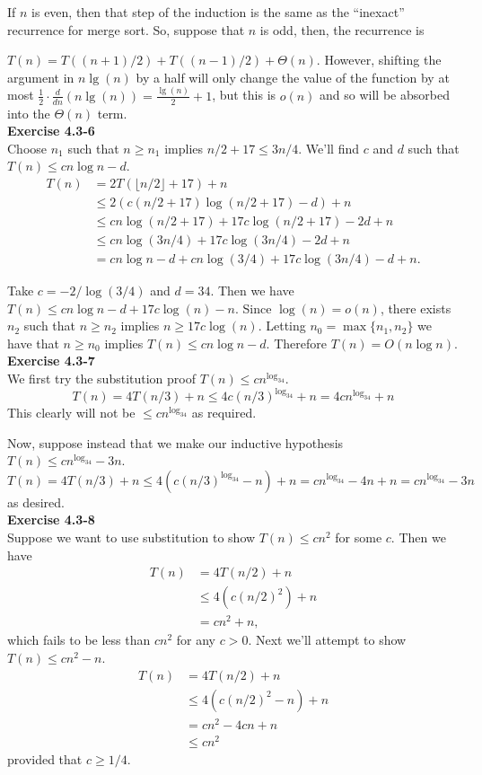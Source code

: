 \documentclass{article}
\begin{document}
If $n$ is even, then that step of the induction is the same as the ``inexact'' recurrence for merge sort. So, suppose that $n$ is odd, then, the recurrence is 

$T(n) = T((n+1)/2) + T((n-1)/2) + \Theta(n)$. However, shifting the argument in $n\lg(n)$ by a half will only change the value of the function by at most $\frac{1}{2}\cdot \frac{d}{dn}( n\lg(n)) = \frac{\lg(n)}{2} + 1$, but this is $o(n)$ and so will be absorbed into the $\Theta(n)$ term.\\

\noindent\textbf{Exercise 4.3-6}\\

Choose $n_1$ such that $n \geq n_1$ implies $n/2 + 17 \leq 3n/4$.  We'll find $c$ and $d$ such that $T(n) \leq cn\log n - d$.
\begin{align*}
T(n) &= 2T(\lfloor n/2 \rfloor + 17) + n \\
&\leq 2(c(n/2 + 17)\log(n/2 + 17) - d) + n \\
&\leq cn\log(n/2 + 17) + 17c\log(n/2 + 17) - 2d + n \\
&\leq cn\log(3n/4) + 17c\log(3n/4) - 2d + n\\
&= cn\log n - d +cn\log(3/4) + 17c\log(3n/4) - d + n.
\end{align*}

Take $c = -2/\log(3/4)$ and $d =34$.  Then we have $T(n) \leq cn\log n - d + 17c\log(n) - n$.  Since $\log(n) = o(n)$, there exists $n_2$ such that $n \geq n_2$ implies $n \geq 17c\log(n)$.  Letting $n_0 = \max\{n_1, n_2\}$ we have that $n \geq n_0$ implies $T(n) \leq cn\log n - d$.  Therefore $T(n) = O(n \log n)$. \\

\noindent\textbf{Exercise 4.3-7}\\

We first try the substitution proof $T(n) \le cn^{\log_34}$.
\[
T(n) = 4T(n/3)+n \le 4 c(n/3)^{\log_34}+n = 4cn^{\log_34}+n
\]
This clearly will not be $\le cn^{\log_34}$ as required.

Now, suppose instead that we make our inductive hypothesis $T(n) \le cn^{\log_34} -3n$.
\[
T(n) = 4T(n/3)+n \le 4(c(n/3)^{\log_34}-n) +n = cn^{\log_34} - 4n + n =cn^{\log_34} - 3n 
\]
as desired.\\


\noindent\textbf{Exercise 4.3-8} \\

Suppose we want to use substitution to show $T(n) \leq cn^2$ for some $c$.  Then we have
\begin{align*}
T(n) &= 4T(n/2) + n \\
&\leq 4(c(n/2)^2) + n \\
&= cn^2 + n,
\end{align*}
which fails to be less than $cn^2$ for any $c > 0$.  Next we'll attempt to show $T(n) \leq cn^2 - n$.
\begin{align*}
T(n)&= 4T(n/2) + n\\
& \leq 4(c(n/2)^2 - n) + n \\
&= cn^2 - 4cn + n \\
&\leq cn^2 
\end{align*}
provided that $c \geq 1/4$.  \\
\end{document}
